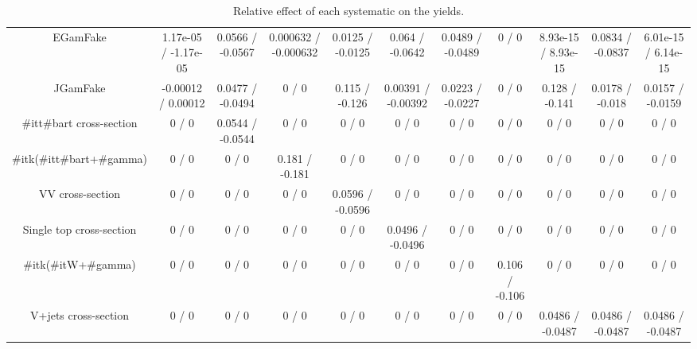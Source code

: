 \begin{table}[htbp]
\begin{center}
\begin{tabular}{|c|c|c|c|c|c|c|c|c|c|c|}
  EGamFake & 1.17e-05 / -1.17e-05 & 0.0566 / -0.0567 & 0.000632 / -0.000632 & 0.0125 / -0.0125 & 0.064 / -0.0642 & 0.0489 / -0.0489 & 0 / 0 & 8.93e-15 / 8.93e-15 & 0.0834 / -0.0837 & 6.01e-15 / 6.14e-15 \\ 
  JGamFake & -0.00012 / 0.00012 & 0.0477 / -0.0494 & 0 / 0 & 0.115 / -0.126 & 0.00391 / -0.00392 & 0.0223 / -0.0227 & 0 / 0 & 0.128 / -0.141 & 0.0178 / -0.018 & 0.0157 / -0.0159 \\ 
  #it{t#bar{t}} cross-section & 0 / 0 & 0.0544 / -0.0544 & 0 / 0 & 0 / 0 & 0 / 0 & 0 / 0 & 0 / 0 & 0 / 0 & 0 / 0 & 0 / 0 \\ 
  #it{k}(#it{t#bar{t}+#gamma}) & 0 / 0 & 0 / 0 & 0.181 / -0.181 & 0 / 0 & 0 / 0 & 0 / 0 & 0 / 0 & 0 / 0 & 0 / 0 & 0 / 0 \\ 
  VV cross-section & 0 / 0 & 0 / 0 & 0 / 0 & 0.0596 / -0.0596 & 0 / 0 & 0 / 0 & 0 / 0 & 0 / 0 & 0 / 0 & 0 / 0 \\ 
  Single top cross-section & 0 / 0 & 0 / 0 & 0 / 0 & 0 / 0 & 0.0496 / -0.0496 & 0 / 0 & 0 / 0 & 0 / 0 & 0 / 0 & 0 / 0 \\ 
  #it{k}(#it{W+#gamma}) & 0 / 0 & 0 / 0 & 0 / 0 & 0 / 0 & 0 / 0 & 0 / 0 & 0.106 / -0.106 & 0 / 0 & 0 / 0 & 0 / 0 \\ 
  V+jets cross-section & 0 / 0 & 0 / 0 & 0 / 0 & 0 / 0 & 0 / 0 & 0 / 0 & 0 / 0 & 0.0486 / -0.0487 & 0.0486 / -0.0487 & 0.0486 / -0.0487 \\ 
\hline 
\end{tabular} 
\caption{Relative effect of each systematic on the yields.} 
\end{center} 
\end{table} 
